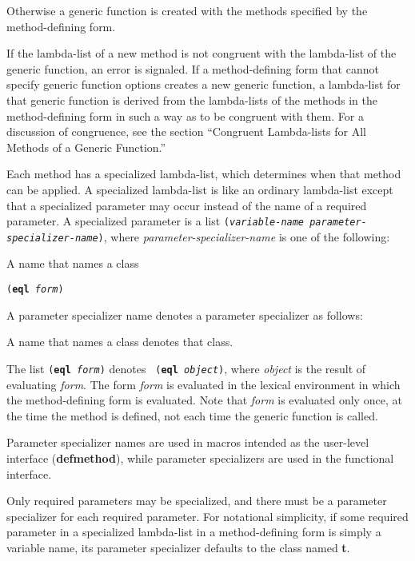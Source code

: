 \item{\bull} Otherwise a generic function is created with the methods
specified by the method-defining form.

\endlist

If the lambda-list of a new method is not congruent with the lambda-list
of the generic function, an error is signaled.  If a
method-defining form that cannot specify generic function options
creates a new generic function, a lambda-list for that generic
function is derived from the lambda-lists of the methods in the
method-defining form in such a way as to be congruent with them.  For
a discussion of {\bit congruence}, see the section ``Congruent
Lambda-lists for All Methods of a Generic Function.''

Each method has a {\bit specialized lambda-list}, which determines
when that method can be applied.  A specialized lambda-list is like
an ordinary lambda-list except that a {\bit specialized parameter\/}
may occur instead of the name of a required parameter.  A specialized parameter
is a list {\tt ({\it variable-name parameter-specializer-name\/})},
where {\it parameter-specializer-name\/} is one of the following: 

\beginlist

\item{\bull} A name that names a class

\item{\bull} {\tt ({\bf eql} {\it form\/})}

\endlist

A parameter specializer name denotes a parameter specializer as follows:

\beginlist

\item{\bull} A name that names a class denotes that class.

\item{\bull} The list {\tt ({\bf eql} {\it form\/})} denotes {\tt
({\bf eql} {\it object\/})}, where {\it object\/} is the result of
evaluating {\it form\/}.  The form {\it form\/} is evaluated in the
lexical environment in which the method-defining form is
evaluated.  Note that {\it form\/} is evaluated only once, at the time
the method is defined, not each time the generic function is called.
\endlist

Parameter specializer names are used in macros intended as the
user-level interface ({\bf defmethod}), while parameter specializers
are used in the functional interface.

Only required parameters may be specialized, and there must be a
parameter specializer for each required parameter.  For notational
simplicity, if some required parameter in a specialized lambda-list in
a method-defining form is simply a variable name, its parameter
specializer defaults to the class named {\bf t}.

